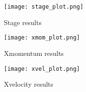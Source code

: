 \begin{figure}[h]
\begin{center}
\texttt{[image: stage\_plot.png]}
\end{center}
\caption{Stage results}
\end{figure}


\begin{figure}[h]
\begin{center}
\texttt{[image: xmom\_plot.png]}
\end{center}
\caption{Xmomentum results}
\end{figure}


\begin{figure}[h]
\begin{center}
\texttt{[image: xvel\_plot.png]}
\end{center}
\caption{Xvelocity results}
\end{figure}


\endinput
